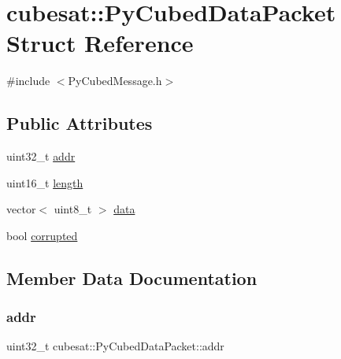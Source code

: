 \hypertarget{structcubesat_1_1PyCubedDataPacket}{}\section{cubesat\+:\+:Py\+Cubed\+Data\+Packet Struct Reference}
\label{structcubesat_1_1PyCubedDataPacket}


{\ttfamily \#include $<$Py\+Cubed\+Message.\+h$>$}

\subsection*{Public Attributes}
\begin{DoxyCompactItemize}
\item 
uint32\+\_\+t \hyperlink{structcubesat_1_1PyCubedDataPacket_aa521741e6590fc052cabb5b87fb5d57a}{addr}
\item 
uint16\+\_\+t \hyperlink{structcubesat_1_1PyCubedDataPacket_a1f7624cbfec16d1c0eab76745589fe44}{length}
\item 
vector$<$ uint8\+\_\+t $>$ \hyperlink{structcubesat_1_1PyCubedDataPacket_a07fc6be7a5ae0f4ccee608fb07264e7e}{data}
\item 
bool \hyperlink{structcubesat_1_1PyCubedDataPacket_a14f2c2937052e77ec5951823f1ca8a58}{corrupted}
\end{DoxyCompactItemize}


\subsection{Member Data Documentation}
\mbox{\label{structcubesat_1_1PyCubedDataPacket_aa521741e6590fc052cabb5b87fb5d57a}} 
\subsubsection{\texorpdfstring{addr}{addr}}
{\footnotesize\ttfamily uint32\+\_\+t cubesat\+::\+Py\+Cubed\+Data\+Packet\+::addr}

\mbox{\label{structcubesat_1_1PyCubedDataPacket_a14f2c2937052e77ec5951823f1ca8a58}} 
